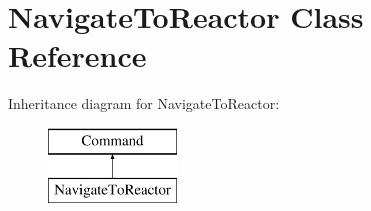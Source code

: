 \hypertarget{classNavigateToReactor}{\section{Navigate\-To\-Reactor Class Reference}
\label{classNavigateToReactor}
}
Inheritance diagram for Navigate\-To\-Reactor\-:\begin{figure}[H]
\begin{center}
\leavevmode
\includegraphics[height=2.000000cm]{classNavigateToReactor}
\end{center}
\end{figure}
